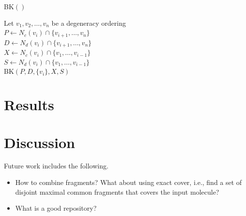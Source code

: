 \documentclass[11pt]{article}
\begin{document}
\begin{algorithm2e}
  \caption{\textsc{BK}$()$}
  \label{alg:bk-degeneracy}
  Let $v_1, v_2, \ldots, v_n$ be a degeneracy ordering\\
  {
    $P \leftarrow N_c(v_i) \cap \{v_{i+1}, \ldots, v_n\}$\\
    $D \leftarrow N_d(v_i) \cap \{v_{i+1}, \ldots, v_n\}$\\
    $X \leftarrow N_c(v_i) \cap \{v_1, \ldots, v_{i-1}\}$\\
    $S \leftarrow N_d(v_i) \cap \{v_1, \ldots, v_{i-1}\}$\\
    \textsc{BK}$(P, D, \{v_i\}, X, S)$
  }
\end{algorithm2e}

\section{Results}



\section{Discussion}

Future work includes the following.
\begin{itemize}
  \item How to combine fragments? What about using exact cover, i.e., find a set
    of disjoint maximal common fragments that covers the input molecule?
  \item What is a good repository?
\end{itemize}



\end{document}
